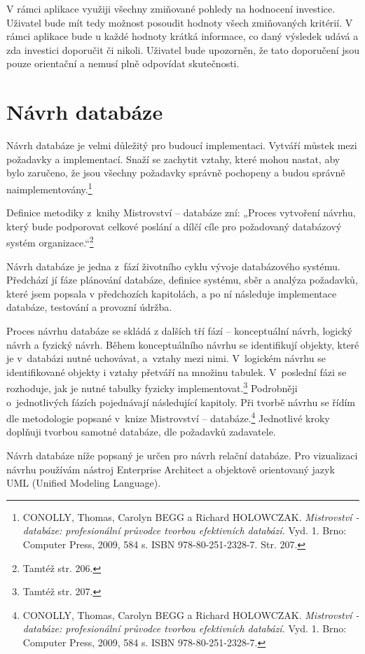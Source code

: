 \documentclass[11pt,a4paper]{article}
\begin{document}
V rámci aplikace využiji všechny zmiňované pohledy na hodnocení investice. Uživatel bude mít tedy možnost posoudit hodnoty všech zmiňovaných kritérií. V rámci aplikace bude u každé hodnoty krátká informace, co daný výsledek udává a zda investici doporučit či nikoli. Uživatel bude upozorněn, že tato doporučení jsou pouze orientační a nemusí plně odpovídat skutečnosti. 

\newpage
\section{Návrh databáze}
Návrh databáze je velmi důležitý pro budoucí implementaci. Vytváří můstek mezi požadavky a implementací. Snaží se zachytit vztahy, které mohou nastat, aby bylo zaručeno, že jsou všechny požadavky správně pochopeny a budou správně naimplementovány.\footnote{CONOLLY, Thomas, Carolyn BEGG a Richard HOLOWCZAK. \textit{Mistrovství - databáze: profesionální průvodce tvorbou efektivních databází.} Vyd. 1. Brno: Computer Press, 2009, 584 s. ISBN 978-80-251-2328-7. Str. 207.}

Definice metodiky z~knihy Mistrovství – databáze zní: „Proces vytvoření návrhu, který bude podporovat celkové poslání a dílčí cíle pro požadovaný databázový systém organizace.“\footnote{Tamtéž str. 206.}

Návrh databáze je jedna z~fází životního cyklu vývoje databázového systému. Předchází jí fáze plánování databáze, definice systému, sběr a analýza požadavků, které jsem popsala v předchozích kapitolách, a po ní následuje implementace databáze, testování a provozní údržba. 

Proces návrhu databáze se skládá z dalších tří fází – konceptuální návrh, logický návrh a fyzický návrh. Během konceptuálního návrhu se identifikují objekty, které je v~databázi nutné uchovávat, a~vztahy mezi nimi. V~logickém návrhu se identifikované objekty i vztahy přetváří na množinu tabulek. V~poslední fázi se rozhoduje, jak je nutné tabulky fyzicky implementovat.\footnote{Tamtéž str. 207.} Podrobněji o~jednotlivých fázích pojednávají následující kapitoly. Při tvorbě návrhu se řídím dle metodologie popsané v~knize Mistrovství – databáze.\footnote{CONOLLY, Thomas, Carolyn BEGG a Richard HOLOWCZAK. \textit{Mistrovství - databáze: profesionální průvodce tvorbou efektivních databází.} Vyd. 1. Brno: Computer Press, 2009, 584 s. ISBN 978-80-251-2328-7.} Jednotlivé kroky doplňuji tvorbou samotné databáze, dle požadavků zadavatele. 

Návrh databáze níže popsaný je určen pro návrh relační databáze. Pro vizualizaci návrhu používám nástroj Enterprise Architect a objektově orientovaný jazyk UML (Unified Modeling Language). 
\end{document}
